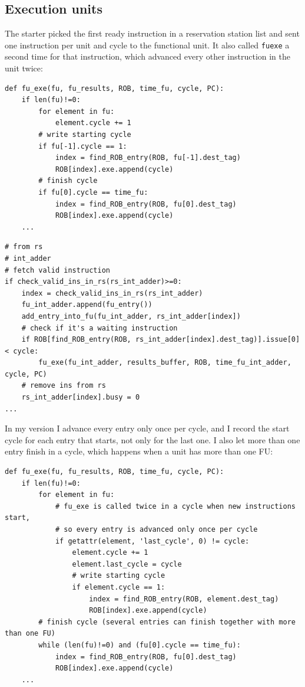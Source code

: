 \documentclass[11pt]{article}
\renewcommand{\_}{\origunderscore\allowbreak}
\begin{document}
\subsection{Execution units}

The starter picked the first ready instruction in a reservation station list and sent one
instruction per unit and cycle to the functional unit. It also called \texttt{fu\_exe} a second
time for that instruction, which advanced every other instruction in the unit twice:

\begin{lstlisting}
def fu_exe(fu, fu_results, ROB, time_fu, cycle, PC):
    if len(fu)!=0:
        for element in fu:
            element.cycle += 1
        # write starting cycle 
        if fu[-1].cycle == 1:
            index = find_ROB_entry(ROB, fu[-1].dest_tag)
            ROB[index].exe.append(cycle)
        # finish cycle
        if fu[0].cycle == time_fu:
            index = find_ROB_entry(ROB, fu[0].dest_tag)
            ROB[index].exe.append(cycle)
    ...
\end{lstlisting}

\begin{lstlisting}
# from rs 
# int_adder
# fetch valid instruction 
if check_valid_ins_in_rs(rs_int_adder)>=0:
    index = check_valid_ins_in_rs(rs_int_adder)
    fu_int_adder.append(fu_entry())
    add_entry_into_fu(fu_int_adder, rs_int_adder[index])
    # check if it's a waiting instruction
    if ROB[find_ROB_entry(ROB, rs_int_adder[index].dest_tag)].issue[0] < cycle:
        fu_exe(fu_int_adder, results_buffer, ROB, time_fu_int_adder, cycle, PC)
    # remove ins from rs 
    rs_int_adder[index].busy = 0
...
\end{lstlisting}

In my version I advance every entry only once per cycle, and I record the start cycle for each
entry that starts, not only for the last one. I also let more than one entry finish in a cycle,
which happens when a unit has more than one FU:

\begin{lstlisting}
def fu_exe(fu, fu_results, ROB, time_fu, cycle, PC):
    if len(fu)!=0:
        for element in fu:
            # fu_exe is called twice in a cycle when new instructions start,
            # so every entry is advanced only once per cycle
            if getattr(element, 'last_cycle', 0) != cycle:
                element.cycle += 1
                element.last_cycle = cycle
                # write starting cycle 
                if element.cycle == 1:
                    index = find_ROB_entry(ROB, element.dest_tag)
                    ROB[index].exe.append(cycle)
        # finish cycle (several entries can finish together with more than one FU)
        while (len(fu)!=0) and (fu[0].cycle == time_fu):
            index = find_ROB_entry(ROB, fu[0].dest_tag)
            ROB[index].exe.append(cycle)
    ...
\end{lstlisting}
\end{document}
